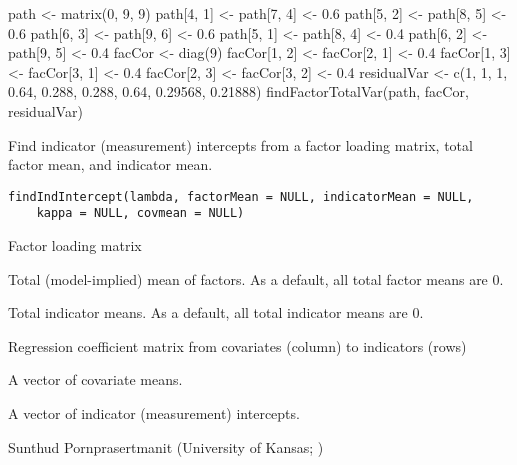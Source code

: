 \documentclass[a4paper]{book}
\begin{document}
%
\begin{Examples}
\begin{ExampleCode}
path <- matrix(0, 9, 9)
path[4, 1] <- path[7, 4] <- 0.6
path[5, 2] <- path[8, 5] <- 0.6
path[6, 3] <- path[9, 6] <- 0.6
path[5, 1] <- path[8, 4] <- 0.4
path[6, 2] <- path[9, 5] <- 0.4
facCor <- diag(9)
facCor[1, 2] <- facCor[2, 1] <- 0.4
facCor[1, 3] <- facCor[3, 1] <- 0.4
facCor[2, 3] <- facCor[3, 2] <- 0.4
residualVar <- c(1, 1, 1, 0.64, 0.288, 0.288, 0.64, 0.29568, 0.21888)
findFactorTotalVar(path, facCor, residualVar)
\end{ExampleCode}
\end{Examples}
%
\begin{Description}\relax
Find indicator (measurement) intercepts from a factor loading matrix, total factor mean, and indicator mean.
\end{Description}
%
\begin{Usage}
\begin{verbatim}
findIndIntercept(lambda, factorMean = NULL, indicatorMean = NULL, 
	kappa = NULL, covmean = NULL)
\end{verbatim}
\end{Usage}
%
\begin{Arguments}
\begin{ldescription}
\item[\code{lambda}] 
Factor loading matrix

\item[\code{factorMean}] 
Total (model-implied) mean of factors. As a default, all total factor means are 0.

\item[\code{indicatorMean}] 
Total indicator means. As a default, all total indicator means are 0.

\item[\code{kappa}] 
Regression coefficient matrix from covariates (column) to indicators (rows)

\item[\code{covmean}] 
A vector of covariate means.

\end{ldescription}
\end{Arguments}
%
\begin{Value}
A vector of indicator (measurement) intercepts.
\end{Value}
%
\begin{Author}\relax
Sunthud Pornprasertmanit (University of Kansas; )
\end{Author}
\end{document}
